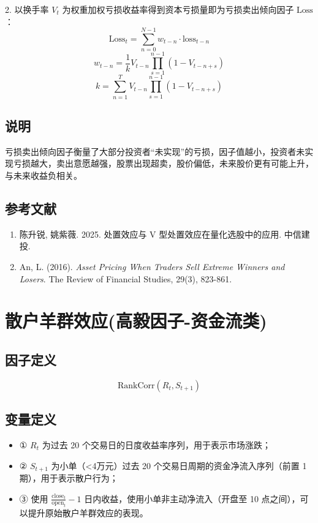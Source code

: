 \documentclass{article}
\begin{document}
2. 以换手率 \( V_t \) 为权重加权亏损收益率得到资本亏损量即为亏损卖出倾向因子 \( \mathrm{Loss} \)：
\begin{equation}
    \mathrm{Loss}_t = \sum_{n=0}^{N-1} w_{t-n} \cdot \mathrm{loss}_{t-n}
\end{equation}
\begin{equation}
    w_{t-n} = \frac{1}{k} V_{t-n} \prod_{s=1}^{n-1} (1 - V_{t-n+s})
\end{equation}
\begin{equation}
    k = \sum_{n=1}^{T} V_{t-n} \prod_{s=1}^{n-1} (1 - V_{t-n+s})
\end{equation}

\subsection{说明}
亏损卖出倾向因子衡量了大部分投资者“未实现”的亏损，因子值越小，投资者未实现亏损越大，卖出意愿越强，股票出现超卖，股价偏低，未来股价更有可能上升，与未来收益负相关。

\subsection{参考文献}
\begin{enumerate}
    \item 陈升锐, 姚紫薇. 2025. 处置效应与 V 型处置效应在量化选股中的应用. 中信建投.
    \item An, L. (2016). \textit{Asset Pricing When Traders Sell Extreme Winners and Losers}. The Review of Financial Studies, 29(3), 823-861.
\end{enumerate}

\section{散户羊群效应(高毅因子-资金流类)}

\subsection{因子定义}
\begin{equation}
    \mathrm{RankCorr}(R_t, S_{t+1})
\end{equation}

\subsection{变量定义}
\begin{itemize}
    \item ① \(R_t\) 为过去 20 个交易日的日度收益率序列，用于表示市场涨跌；
    \item ② \(S_{t+1}\) 为小单（<4万元）过去 20 个交易日周期的资金净流入序列（前置 1 期），用于表示散户行为；
    \item ③ 使用 \(\frac{\mathrm{close}_t}{\mathrm{open}_t} - 1\) 日内收益，使用小单非主动净流入（开盘至 10 点之间），可以提升原始散户羊群效应的表现。
\end{itemize}
\end{document}

